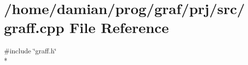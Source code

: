 \section{/home/damian/prog/graf/prj/src/graff.cpp File Reference}
\label{graff_8cpp}
{\ttfamily \#include \char`\"{}graff.\-h\char`\"{}}\\*

